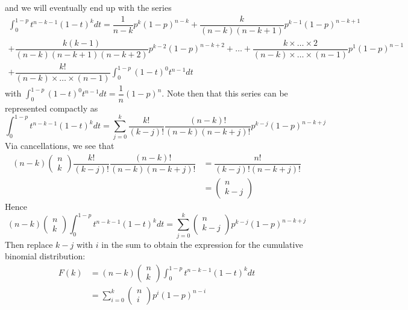 \documentclass[11pt]{report} %
\begin{document}
and we will eventually end up with the series
\begin{multline}
\int_{0}^{1 - p}t^{n - k - 1}\left(1 - t\right)^{k}dt = \dfrac{1}{n - k}p^{k}\left(1 - p\right)^{n - k} + \dfrac{k}{\left(n - k\right)\left(n - k + 1\right)}p^{k - 1}\left(1 - p\right)^{n - k + 1} \\
 + \dfrac{k\left(k - 1\right)}{\left(n - k\right)\left(n - k + 1\right)\left(n - k + 2\right)}p^{k - 2}\left(1 - p\right)^{n - k + 2} + \dots + \dfrac{k\times\dots\times 2}{\left(n - k\right)\times\dots\times\left(n - 1\right)}p^{1}\left(1 - p\right)^{n - 1} \\
  + \dfrac{k!}{\left(n - k\right)\times\dots\times\left(n - 1\right)}\int_{0}^{1 - p}\left(1 - t\right)^{0}t^{n - 1}dt
\end{multline}
with $\int_{0}^{1 - p}\left(1 - t\right)^{0}t^{n - 1}dt = \dfrac{1}{n}\left(1 - p\right)^{n}$. Note then that this series can be represented compactly as
\begin{equation}
\int_{0}^{1 - p}t^{n - k - 1}\left(1 - t\right)^{k}dt = \sum_{j = 0}^{k}\dfrac{k!}{\left(k - j\right)!}\dfrac{\left(n - k\right)!}{\left(n - k\right)\left(n - k + j\right)!}p^{k - j}\left(1 - p\right)^{n - k + j}
\end{equation}
Via cancellations, we see that
\begin{align}
\left(n - k\right)\begin{pmatrix}n \\ k\end{pmatrix}\dfrac{k!}{\left(k - j\right)!}\dfrac{\left(n - k\right)!}{\left(n - k\right)\left(n - k + j\right)!} &= \dfrac{n!}{\left(k - j\right)!\left(n - k + j\right)!} \\
&= \begin{pmatrix}n \\ k - j\end{pmatrix}
\end{align}
Hence
\begin{equation}
\left(n - k\right)\begin{pmatrix}n \\ k\end{pmatrix}\int_{0}^{1 - p}t^{n - k - 1}\left(1 - t\right)^{k}dt = \sum_{j = 0}^{k}\begin{pmatrix}n \\ k - j\end{pmatrix}p^{k - j}\left(1 - p\right)^{n - k + j}
\end{equation}
Then replace $k - j$ with $i$ in the sum to obtain the expression for the cumulative binomial distribution:
\begin{align}
F\left(k\right) &= \left(n - k\right)\begin{pmatrix}n \\ k\end{pmatrix}\int_{0}^{1 - p}t^{n - k - 1}\left(1 - t\right)^{k}dt \\
&= \sum_{i = 0}^{k}\begin{pmatrix}n \\ i\end{pmatrix}p^{i}\left(1 - p\right)^{n - i}
\end{align}
\end{document}
